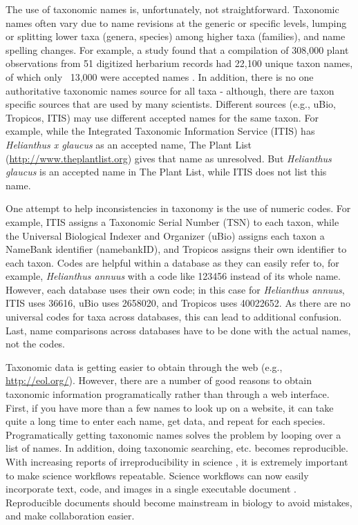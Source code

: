 \documentclass[10pt,a4paper,twocolumn]{article}
\begin{document}
The use of taxonomic names is, unfortunately, not straightforward. Taxonomic names often vary due to name revisions at the generic or specific levels, lumping or splitting lower taxa (genera, species) among higher taxa (families), and name spelling changes. For example, a study found that a compilation of 308,000 plant observations from 51 digitized herbarium records had 22,100 unique taxon names, of which only ~13,000 were accepted names \cite{weiser2007,boyle2013}. In addition, there is no one authoritative taxonomic names source for all taxa - although, there are taxon specific sources that are used by many scientists. Different sources (e.g., uBio, Tropicos, ITIS) may use different accepted names for the same taxon. For example, while the Integrated Taxonomic Information Service (ITIS) has \emph{Helianthus x glaucus} as an accepted name, The Plant List (\url{http://www.theplantlist.org}) gives that name as unresolved. But \emph{Helianthus glaucus} is an accepted name in The Plant List, while ITIS does not list this name. 

One attempt to help inconsistencies in taxonomy is the use of numeric codes. For example, ITIS assigns a Taxonomic Serial Number (TSN) to each taxon, while the Universal Biological Indexer and Organizer (uBio) assigns each taxon a NameBank identifier (namebankID), and Tropicos assigns their own identifier to each taxon. Codes are helpful within a database as they can easily refer to, for example, \emph{Helianthus annuus} with a code like 123456 instead of its whole name. However, each database uses their own code; in this case for \emph{Helianthus annuus}, ITIS uses 36616, uBio uses 2658020, and Tropicos uses 40022652. As there are no universal codes for taxa across databases, this can lead to additional confusion. Last, name comparisons across databases have to be done with the actual names, not the codes. 

Taxonomic data is getting easier to obtain through the web (e.g., \url{http://eol.org/}). However, there are a number of good reasons to obtain taxonomic information programatically rather than through a web interface. First, if you have more than a few names to look up on a website, it can take quite a long time to enter each name, get data, and repeat for each species. Programatically getting taxonomic names solves the problem by looping over a list of names. In addition, doing taxonomic searching, etc. becomes reproducible. With increasing reports of irreproducibility in science \cite{stodden2010,zimmer2012}, it is extremely important to make science workflows repeatable. Science workflows can now easily incorporate text, code, and images in a single executable document \cite{yihui2013}. Reproducible documents should become mainstream in biology to avoid mistakes, and make collaboration easier.
\end{document}
